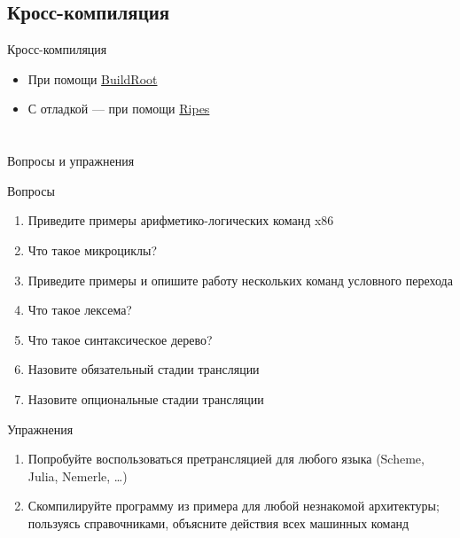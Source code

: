 \documentclass[xetex,aspectratio=43]{beamer}
\begin{document}
\subsection{Кросс-компиляция}

\begin{frame}{Кросс-компиляция}
    \begin{itemize}
        \item При помощи \href{https://buildroot.org/}{BuildRoot}
        \item С отладкой — при помощи \href{http://ripes.me/Ripes/}{Ripes} %
    \end{itemize}
\end{frame}


\section*{}

\begin{frame}{Вопросы и упражнения}
    \begin{block}{Вопросы}
        \protect\hypertarget{ux432ux43eux43fux440ux43eux441ux44b}{}
        \begin{enumerate}
            \tightlist
            \item
            Приведите примеры арифметико-логических команд x86
            \item
            Что такое микроциклы?
            \item
            Приведите примеры и опишите работу нескольких команд условного
            перехода
            \item
            Что такое лексема?
            \item
            Что такое синтаксическое дерево?
            \item
            Назовите обязательный стадии трансляции
            \item
            Назовите опциональные стадии трансляции
        \end{enumerate}
    \end{block}

    \begin{block}{Упражнения}
        \protect\hypertarget{ux443ux43fux440ux430ux436ux43dux435ux43dux438ux44f}{}
        \begin{enumerate}
            \tightlist
            \item
            Попробуйте воспользоваться претрансляцией для любого языка (Scheme,
            Julia, Nemerle, \ldots)
            \item
            Скомпилируйте программу из примера для любой незнакомой архитектуры;
            пользуясь справочниками, объясните действия всех машинных команд
        \end{enumerate}
    \end{block}
\end{frame}

\postamble
\end{document}
